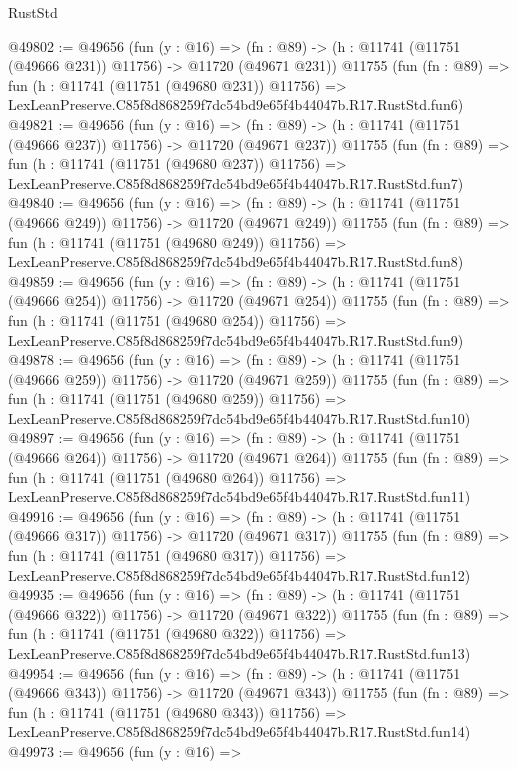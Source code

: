 \begin{lexlean}{RustStd}
\begin{coremodule}
@49802 := @49656
    (fun (y : @16) =>
    (fn : @89) -> (h : @11741 (@11751 (@49666 @231)) @11756) -> @11720 (@49671 @231))
    @11755
    (fun (fn : @89) =>
    fun (h : @11741 (@11751 (@49680 @231)) @11756) =>
    LexLeanPreserve.C85f8d868259f7dc54bd9e65f4b44047b.R17.RustStd.fun6)
@49821 := @49656
    (fun (y : @16) =>
    (fn : @89) -> (h : @11741 (@11751 (@49666 @237)) @11756) -> @11720 (@49671 @237))
    @11755
    (fun (fn : @89) =>
    fun (h : @11741 (@11751 (@49680 @237)) @11756) =>
    LexLeanPreserve.C85f8d868259f7dc54bd9e65f4b44047b.R17.RustStd.fun7)
@49840 := @49656
    (fun (y : @16) =>
    (fn : @89) -> (h : @11741 (@11751 (@49666 @249)) @11756) -> @11720 (@49671 @249))
    @11755
    (fun (fn : @89) =>
    fun (h : @11741 (@11751 (@49680 @249)) @11756) =>
    LexLeanPreserve.C85f8d868259f7dc54bd9e65f4b44047b.R17.RustStd.fun8)
@49859 := @49656
    (fun (y : @16) =>
    (fn : @89) -> (h : @11741 (@11751 (@49666 @254)) @11756) -> @11720 (@49671 @254))
    @11755
    (fun (fn : @89) =>
    fun (h : @11741 (@11751 (@49680 @254)) @11756) =>
    LexLeanPreserve.C85f8d868259f7dc54bd9e65f4b44047b.R17.RustStd.fun9)
@49878 := @49656
    (fun (y : @16) =>
    (fn : @89) -> (h : @11741 (@11751 (@49666 @259)) @11756) -> @11720 (@49671 @259))
    @11755
    (fun (fn : @89) =>
    fun (h : @11741 (@11751 (@49680 @259)) @11756) =>
    LexLeanPreserve.C85f8d868259f7dc54bd9e65f4b44047b.R17.RustStd.fun10)
@49897 := @49656
    (fun (y : @16) =>
    (fn : @89) -> (h : @11741 (@11751 (@49666 @264)) @11756) -> @11720 (@49671 @264))
    @11755
    (fun (fn : @89) =>
    fun (h : @11741 (@11751 (@49680 @264)) @11756) =>
    LexLeanPreserve.C85f8d868259f7dc54bd9e65f4b44047b.R17.RustStd.fun11)
@49916 := @49656
    (fun (y : @16) =>
    (fn : @89) -> (h : @11741 (@11751 (@49666 @317)) @11756) -> @11720 (@49671 @317))
    @11755
    (fun (fn : @89) =>
    fun (h : @11741 (@11751 (@49680 @317)) @11756) =>
    LexLeanPreserve.C85f8d868259f7dc54bd9e65f4b44047b.R17.RustStd.fun12)
@49935 := @49656
    (fun (y : @16) =>
    (fn : @89) -> (h : @11741 (@11751 (@49666 @322)) @11756) -> @11720 (@49671 @322))
    @11755
    (fun (fn : @89) =>
    fun (h : @11741 (@11751 (@49680 @322)) @11756) =>
    LexLeanPreserve.C85f8d868259f7dc54bd9e65f4b44047b.R17.RustStd.fun13)
@49954 := @49656
    (fun (y : @16) =>
    (fn : @89) -> (h : @11741 (@11751 (@49666 @343)) @11756) -> @11720 (@49671 @343))
    @11755
    (fun (fn : @89) =>
    fun (h : @11741 (@11751 (@49680 @343)) @11756) =>
    LexLeanPreserve.C85f8d868259f7dc54bd9e65f4b44047b.R17.RustStd.fun14)
@49973 := @49656
    (fun (y : @16) =>

\end{coremodule}
\end{lexlean}
